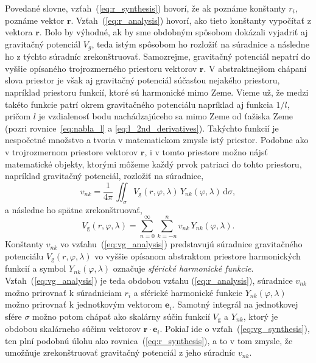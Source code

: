 \documentclass[a4paper, 12pt]{book}
\newcommand{\diff}{\mathrm d}
\newcommand{\gidx}{\mathrm g}
\let\vec\mathbf
\begin{document}
Povedané slovne, vzťah~(\ref{eq:r_synthesis}) hovorí, že ak poznáme konštanty 
$r_i$, poznáme vektor $\vec r$.  Vzťah~(\ref{eq:r_analysis}) hovorí, ako tieto 
konštanty vypočítať z vektora $\vec r$.  Bolo by výhodné, ak by sme obdobným 
spôsobom dokázali vyjadriť aj gravitačný potenciál $V_g$, teda istým spôsobom 
ho rozložiť na súradnice a následne ho z týchto súradníc zrekonštruovať.  
Samozrejme, gravitačný potenciál nepatrí do vyššie opísaného trojrozmerného 
priestoru vektorov $\vec r$.  V abstraktnejšom chápaní slova priestor je však 
aj gravitačný potenciál súčasťou nejakého priestoru, napríklad priestoru 
funkcií, ktoré sú harmonické mimo Zeme.  Vieme už, že medzi takéto funkcie 
patrí okrem gravitačného potenciálu napríklad aj funkcia $1 \slash l$, pričom 
$l$ je vzdialenosť bodu nachádzajúceho sa mimo Zeme od ťažiska Zeme (pozri 
rovnice~\ref{eq:nabla_l} a \ref{eq:l_2nd_derivatives}).  Takýchto funkcií je 
nespočetné množstvo a tvoria v matematickom zmysle istý priestor.  Podobne ako 
v trojrozmernom priestore vektorov $\vec r$, i v tomto priestore možno nájsť 
matematické objekty, ktorými môžeme každý prvok patriaci do tohto priestoru, 
napríklad gravitačný potenciál, rozložiť na súradnice,
%
\begin{equation}
\label{eq:vg_analysis}
v_{nk} = \frac{1}{4\pi} \, \iint_{\sigma} V_\gidx(r, \varphi, \lambda) \, 
Y_{nk}(\varphi, \lambda) \, \diff \sigma{,}
\end{equation}
%
a následne ho spätne zrekonštruovať,
%
\begin{equation}
\label{eq:vg_synthesis}
V_\gidx(r, \varphi, \lambda) = \sum_{n = 0}^{\infty} \sum_{k = -n}^{n} v_{nk} 
\, Y_{nk}(\varphi, \lambda){.}
\end{equation}
%
Konštanty $v_{nk}$ vo vzťahu~(\ref{eq:vg_analysis}) predstavujú súradnice 
gravitačného potenciálu $V_\gidx(r, \varphi, \lambda)$ vo vyššie opísanom 
abstraktom priestore harmonických funkcií a symbol $Y_{nk}(\varphi, \lambda)$ 
označuje \emph{sférické harmonické funkcie}.  Vzťah~(\ref{eq:vg_analysis}) je 
teda obdobou vzťahu (\ref{eq:r_analysis}), súradnice $v_{nk}$ možno prirovnať 
k súradniciam $r_i$ a sférické harmonické funkcie $Y_{nk}(\varphi, \lambda)$ 
možno prirovnať k jednotkovým vektorom $\vec e_i$.  Samotný integrál na 
jednotkovej sfére $\sigma$ možno potom chápať ako skalárny súčin funkcií 
$V_\gidx$ a $Y_{nk}$, ktorý je obdobou skalárneho súčinu vektorov $\vec r \cdot 
\vec e_i$.  Pokiaľ ide o vzťah~(\ref{eq:vg_synthesis}), ten plní podobnú úlohu 
ako rovnica~(\ref{eq:r_synthesis}), a to v tom zmysle, že umožňuje 
zrekonštruovať gravitačný potenciál z jeho súradníc $v_{nk}$.
\end{document}
